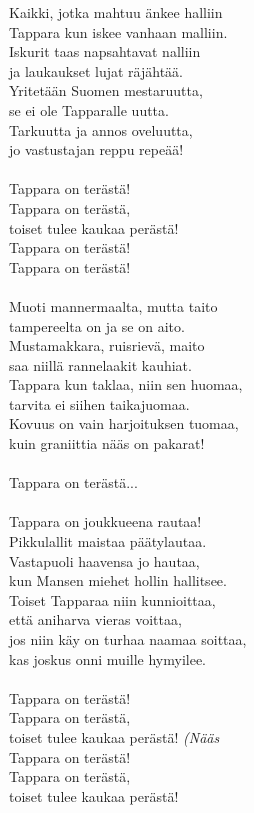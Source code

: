 
Kaikki, jotka mahtuu änkee halliin \\
Tappara kun iskee vanhaan malliin. \\
Iskurit taas napsahtavat nalliin \\
ja laukaukset lujat räjähtää. \\
Yritetään Suomen mestaruutta, \\
se ei ole Tapparalle uutta. \\
Tarkuutta ja annos oveluutta, \\
jo vastustajan reppu repeää! \\
\hspace{10mm} \\
Tappara on terästä! \\
Tappara on terästä, \\
toiset tulee kaukaa perästä! \\
Tappara on terästä! \\
Tappara on terästä! \\
\hspace{10mm} \\
Muoti mannermaalta, mutta taito \\
tampereelta on ja se on aito. \\
Mustamakkara, ruisrievä, maito \\
saa niillä rannelaakit kauhiat. \\
Tappara kun taklaa, niin sen huomaa, \\
tarvita ei siihen taikajuomaa. \\
Kovuus on vain harjoituksen tuomaa, \\
kuin graniittia nääs on pakarat! \\
\hspace{10mm} \\
Tappara on terästä... \\
\hspace{10mm} \\
Tappara on joukkueena rautaa! \\
Pikkulallit maistaa päätylautaa. \\
Vastapuoli haavensa jo hautaa, \\
kun Mansen miehet hollin hallitsee. \\
Toiset Tapparaa niin kunnioittaa, \\
että aniharva vieras voittaa, \\
jos niin käy on turhaa naamaa soittaa, \\
kas joskus onni muille hymyilee. \\
\hspace{10mm} \\
Tappara on terästä! \\
Tappara on terästä, \\
toiset tulee kaukaa perästä! \textit{(Nääs} \\
Tappara on terästä! \\
Tappara on terästä, \\
toiset tulee kaukaa perästä! \\
